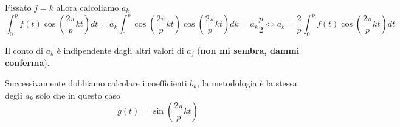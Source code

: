 Fissato $j=k$ allora calcoliamo $a_k$  
\begin{equation*}
    \int_{0}^{p}f(t)\cos (\frac{2\pi}{p}kt) dt= a_k\int_{0}^{p}\cos (\frac{2\pi}{p}kt)\cos (\frac{2\pi}{p}kt)dk = a_k \frac{p}{2} \iff a_k =\frac{2}{p}  \int_{0}^{p}f(t)\cos (\frac{2\pi}{p}kt) dt
\end{equation*}

Il conto di $a_k$ è indipendente dagli altri valori di $a_j$ (\textbf{non mi sembra, dammi conferma}).

Successivamente dobbiamo calcolare i coefficienti $b_k$, la metodologia è la stessa
degli $a_k$ solo che in questo caso 
$$g(t) = \sin(\frac{2\pi}{p}kt)$$ 


\begin{equation*}
\end{equation*}
